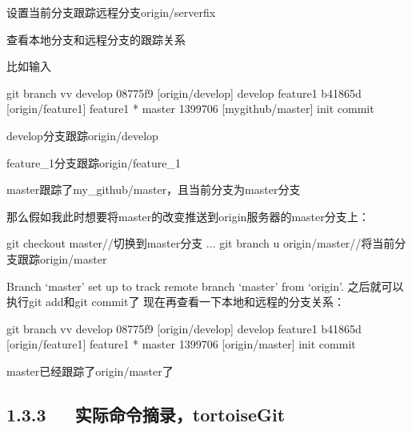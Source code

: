 \documentclass[letterpaper,12pt,english]{sphinxmanual}
\begin{document}
设置当前分支跟踪远程分支origin/serverfix

查看本地分支和远程分支的跟踪关系

\begin{sphinxVerbatim}[commandchars=\\\{\}]
  
\end{sphinxVerbatim}

比如输入

\begin{sphinxVerbatim}[commandchars=\\\{\}]
\PYGZdl{} git branch \PYGZhy{}vv
  develop   08775f9 [origin/develop] develop
  feature\PYGZus{}1 b41865d [origin/feature\PYGZus{}1] feature\PYGZus{}1
* master    1399706 [my\PYGZus{}github/master] init commit
\end{sphinxVerbatim}

develop分支跟踪origin/develop

feature\_1分支跟踪origin/feature\_1

master跟踪了my\_github/master，且当前分支为master分支

那么假如我此时想要将master的改变推送到origin服务器的master分支上：

\begin{sphinxVerbatim}[commandchars=\\\{\}]
\PYGZdl{} git checkout master//切换到master分支
...
\PYGZdl{} git branch \PYGZhy{}u origin/master//将当前分支跟踪origin/master
\end{sphinxVerbatim}

Branch ‘master’ set up to track remote branch ‘master’ from ‘origin’.
之后就可以执行git add和git commit了
现在再查看一下本地和远程的分支关系：

\begin{sphinxVerbatim}[commandchars=\\\{\}]
\PYGZdl{} git branch \PYGZhy{}vv
  develop   08775f9 [origin/develop] develop
  feature\PYGZus{}1 b41865d [origin/feature\PYGZus{}1] feature\PYGZus{}1
* master    1399706 [origin/master] init commit
\end{sphinxVerbatim}

master已经跟踪了origin/master了


\subsection{1.3.3   实际命令摘录，tortoiseGit}
\label{\detokenize{001software/001install/001._u7f51_u7ad9/github:tortoisegit}}
\end{document}
